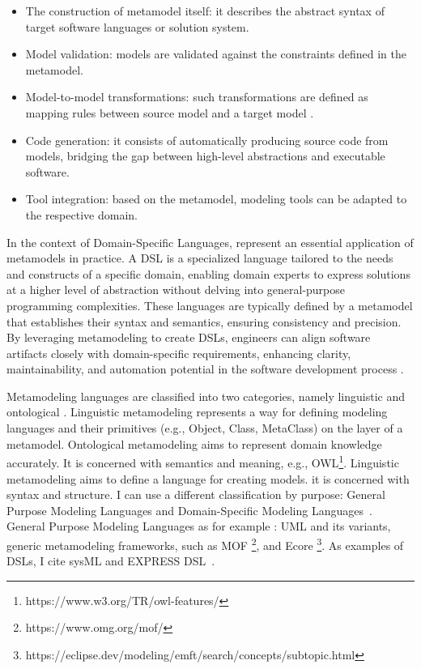 \begin{itemize}
\item The construction of metamodel itself: it describes the abstract syntax of target software languages or  solution system.
\item Model validation: models are validated against the constraints defined in the metamodel. 
\item Model-to-model transformations: such transformations are defined as mapping rules between source model and a target model .
\item Code generation: it consists of automatically producing source code from models, bridging the gap between high-level abstractions and executable software.
\item Tool integration: based on the metamodel, modeling tools can be adapted to the respective domain. 
\end{itemize}


In the context of Domain-Specific Languages,  represent an essential application of metamodels in practice. A DSL is a specialized language tailored to the needs and constructs of a specific domain, enabling domain experts to express solutions at a higher level of abstraction without delving into general-purpose programming complexities. These languages are typically defined by a metamodel that establishes their syntax and semantics, ensuring consistency and precision. By leveraging metamodeling to create DSLs, engineers can align software artifacts closely with domain-specific requirements, enhancing clarity, maintainability, and automation potential in the software development process \cite{volter2013model}. 




Metamodeling languages are classified into two categories, namely linguistic and ontological \cite{gavsevic2007metamodeling}. Linguistic metamodeling represents a way for defining modeling languages and their primitives (e.g., Object, Class, MetaClass) on the layer of a metamodel. Ontological metamodeling aims to represent domain knowledge accurately. It is concerned with semantics and meaning, e.g., OWL\footnote{https://www.w3.org/TR/owl-features/}. Linguistic metamodeling aims to define a language for creating models. it is concerned with syntax and structure.
I can use a different classification by purpose: General Purpose Modeling Languages and Domain-Specific Modeling Languages~\cite{de2012domain}. General Purpose Modeling Languages as for example : UML and its variants, generic metamodeling frameworks, such as MOF \footnote{https://www.omg.org/mof/}, and Ecore \footnote{https://eclipse.dev/modeling/emft/search/concepts/subtopic.html}. As examples of DSLs, I cite sysML and EXPRESS DSL~\cite{wortmann2020modeling}.

